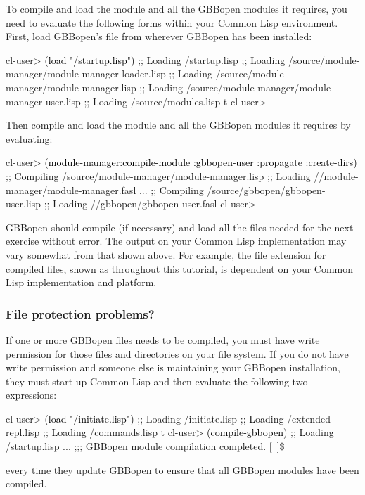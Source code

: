 \documentclass[10pt,twoside,english,pdftex]{article}
\begin{document}
To compile and load the  module and all the GBBopen
modules it requires, you need to evaluate the following forms within your
Common Lisp environment.  First, load GBBopen's
 file from wherever GBBopen
has been installed:
%
\W\supp
\begin{example}
\textcolor{darkergray}{%
  cl-user> \textcolor{black}{(load "/startup.lisp")}
  ;; Loading /startup.lisp
  ;;  Loading /source/module-manager/module-manager-loader.lisp
  ;;   Loading /source/module-manager/module-manager.lisp
  ;;     Loading /source/module-manager/module-manager-user.lisp
  ;;  Loading /source/modules.lisp
  t
  cl-user>}
\end{example}
%
%
Then compile and load the  module and all the
GBBopen modules it requires by evaluating:
%
\W\supp\notpretop
\begin{example}
\textcolor{darkergray}{%
  cl-user> \textcolor{black}{(module-manager:compile-module :gbbopen-user :propagate :create-dirs)}
  ;; Compiling /source/module-manager/module-manager.lisp
  ;; Loading //module-manager/module-manager.fasl
       ...
  ;; Compiling /source/gbbopen/gbbopen-user.lisp
  ;; Loading //gbbopen/gbbopen-user.fasl
  cl-user>}
\end{example}

GBBopen should compile (if necessary) and load all the files needed for the
next exercise without error.  The output on your Common Lisp implementation
may vary somewhat from that shown above.  For example, the file extension for
compiled files, shown as  throughout this tutorial, is dependent on
your Common Lisp implementation and platform.

\subsubsection*{File protection problems?}

%
%
%
%
If one or more GBBopen files needs to be compiled, you must have write
permission for those files and directories on your file system.  If you do not
have write permission and someone else is maintaining your GBBopen
installation, they must start up Common Lisp and then evaluate the following
two expressions:
%
\W\supp
\begin{example}
\textcolor{darkergray}{%
  cl-user> \textcolor{black}{(load "/initiate.lisp")}
  ;; Loading /initiate.lisp
  ;;  Loading /extended-repl.lisp
  ;;  Loading /commands.lisp
  t
  cl-user> \textcolor{black}{(compile-gbbopen)}
  ;; Loading /startup.lisp
     ...
  ;;; GBBopen module compilation completed.
  [~]\$}
\end{example}
%
every time they update GBBopen to ensure that all GBBopen modules have
been compiled.
\end{document}
